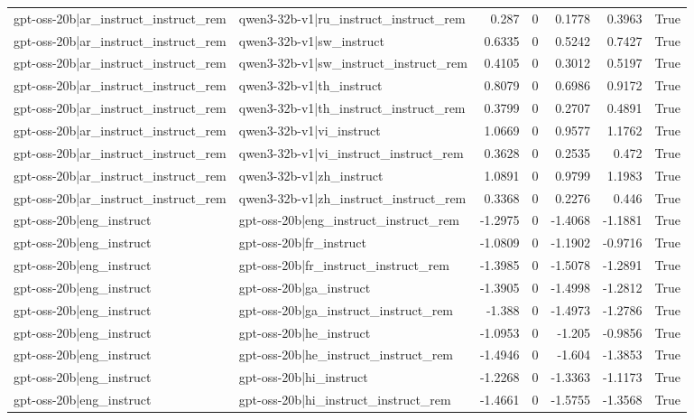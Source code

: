 \begin{table}
\begin{tabular}{l l r r r r l}
gpt-oss-20b|ar_instruct_instruct_rem & qwen3-32b-v1|ru_instruct_instruct_rem & 0.287 & 0 & 0.1778 & 0.3963 & True \\
gpt-oss-20b|ar_instruct_instruct_rem & qwen3-32b-v1|sw_instruct & 0.6335 & 0 & 0.5242 & 0.7427 & True \\
gpt-oss-20b|ar_instruct_instruct_rem & qwen3-32b-v1|sw_instruct_instruct_rem & 0.4105 & 0 & 0.3012 & 0.5197 & True \\
gpt-oss-20b|ar_instruct_instruct_rem & qwen3-32b-v1|th_instruct & 0.8079 & 0 & 0.6986 & 0.9172 & True \\
gpt-oss-20b|ar_instruct_instruct_rem & qwen3-32b-v1|th_instruct_instruct_rem & 0.3799 & 0 & 0.2707 & 0.4891 & True \\
gpt-oss-20b|ar_instruct_instruct_rem & qwen3-32b-v1|vi_instruct & 1.0669 & 0 & 0.9577 & 1.1762 & True \\
gpt-oss-20b|ar_instruct_instruct_rem & qwen3-32b-v1|vi_instruct_instruct_rem & 0.3628 & 0 & 0.2535 & 0.472 & True \\
gpt-oss-20b|ar_instruct_instruct_rem & qwen3-32b-v1|zh_instruct & 1.0891 & 0 & 0.9799 & 1.1983 & True \\
gpt-oss-20b|ar_instruct_instruct_rem & qwen3-32b-v1|zh_instruct_instruct_rem & 0.3368 & 0 & 0.2276 & 0.446 & True \\
gpt-oss-20b|eng_instruct & gpt-oss-20b|eng_instruct_instruct_rem & -1.2975 & 0 & -1.4068 & -1.1881 & True \\
gpt-oss-20b|eng_instruct & gpt-oss-20b|fr_instruct & -1.0809 & 0 & -1.1902 & -0.9716 & True \\
gpt-oss-20b|eng_instruct & gpt-oss-20b|fr_instruct_instruct_rem & -1.3985 & 0 & -1.5078 & -1.2891 & True \\
gpt-oss-20b|eng_instruct & gpt-oss-20b|ga_instruct & -1.3905 & 0 & -1.4998 & -1.2812 & True \\
gpt-oss-20b|eng_instruct & gpt-oss-20b|ga_instruct_instruct_rem & -1.388 & 0 & -1.4973 & -1.2786 & True \\
gpt-oss-20b|eng_instruct & gpt-oss-20b|he_instruct & -1.0953 & 0 & -1.205 & -0.9856 & True \\
gpt-oss-20b|eng_instruct & gpt-oss-20b|he_instruct_instruct_rem & -1.4946 & 0 & -1.604 & -1.3853 & True \\
gpt-oss-20b|eng_instruct & gpt-oss-20b|hi_instruct & -1.2268 & 0 & -1.3363 & -1.1173 & True \\
gpt-oss-20b|eng_instruct & gpt-oss-20b|hi_instruct_instruct_rem & -1.4661 & 0 & -1.5755 & -1.3568 & True \\

\end{tabular}
\end{table}
